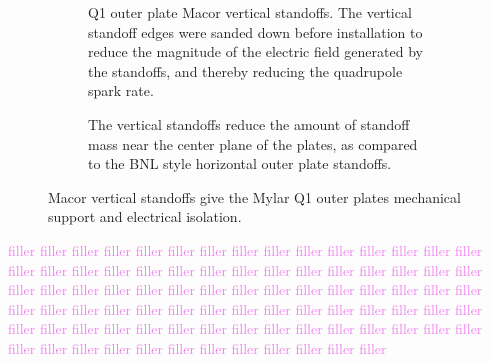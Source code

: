\begin{figure}[]
	\centering
	\begin{subfigure}{\columnwidth}
		\caption{Q1 outer plate Macor vertical standoffs. The vertical standoff edges were sanded down before installation to reduce the magnitude of the electric field generated by the standoffs, and thereby reducing the quadrupole spark rate.}\label{fig:preinstall_vertical_standoffs}
	\end{subfigure}
	\begin{subfigure}{\columnwidth}
		\caption{The vertical standoffs reduce the amount of standoff mass near the center plane of the plates, as compared to the BNL style horizontal outer plate standoffs.}\label{fig:in_situ_vertical_standoffs}
	\end{subfigure}
	\caption{Macor vertical standoffs give the Mylar Q1 outer plates mechanical support and electrical isolation.}\label{fig:vertical_standoffs}
\end{figure}

\textcolor{violet}{filler filler filler filler filler filler filler filler filler filler filler filler filler filler filler filler filler filler filler filler filler filler filler filler filler filler filler filler filler filler filler filler filler filler filler filler filler filler filler filler filler filler filler filler filler filler filler filler filler filler filler filler filler filler filler filler filler filler filler filler filler filler filler filler filler filler filler filler filler filler filler filler filler filler filler filler filler filler filler filler filler filler filler filler filler filler filler}


